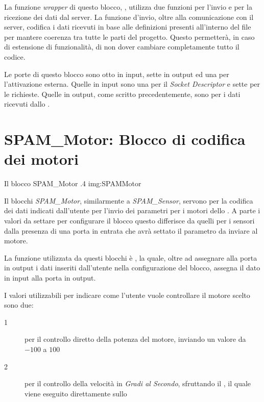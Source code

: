 La funzione \emph{wrapper} di questo blocco, \linebreak {}, utilizza due funzioni per
l'invio e per la ricezione dei dati dal server. La funzione d'invio, oltre
alla comunicazione con il server, codifica i dati ricevuti in base alle
definizioni presenti all'interno del file  per mantere
coerenza tra tutte le parti del progetto. Questo permetterà, in caso di
estensione di funzionalità, di non dover cambiare completamente tutto il
codice.

Le porte di questo blocco sono otto in input, sette in output ed una per
l'attivazione esterna. Quelle in input sono una per il \emph{Socket
Descriptor} e sette per le richieste. Quelle in output, come scritto
precedentemente, sono per i dati ricevuti dallo \SPAM{}.

\section[SPAM\_Motor]{SPAM\_Motor: Blocco di codifica dei motori}
        {Il blocco SPAM\_Motor}
        {.4}
        {img:SPAMMotor}

Il blocchi \emph{SPAM\_Motor}, similarmente a \emph{SPAM\_Sensor}, servono
per la codifica dei dati indicati dall'utente per l'invio dei parametri per
i motori dello \SPAM{}. A parte i valori da settare per configurare il
blocco questo differisce da quelli per i sensori dalla presenza di una
porta in entrata che avrà settato il parametro da inviare al motore.

La funzione utilizzata da questi blocchi è \linebreak
{}, la quale, oltre
ad assegnare alla porta in output i dati inseriti dall'utente nella
configurazione del blocco, assegna il dato in input alla porta in output.

I valori utilizzabili per indicare come l'utente vuole controllare il
motore scelto sono due:
\begin{description}
    \item[1] per il controllo diretto della potenza del motore, inviando un
        valore da $-100$ a $100$
    \item[2] per il controllo della velocità in \emph{Gradi al Secondo},
        sfruttando il \PID{}, il quale viene eseguito direttamente sullo
        \SPAM{}
\end{description}


